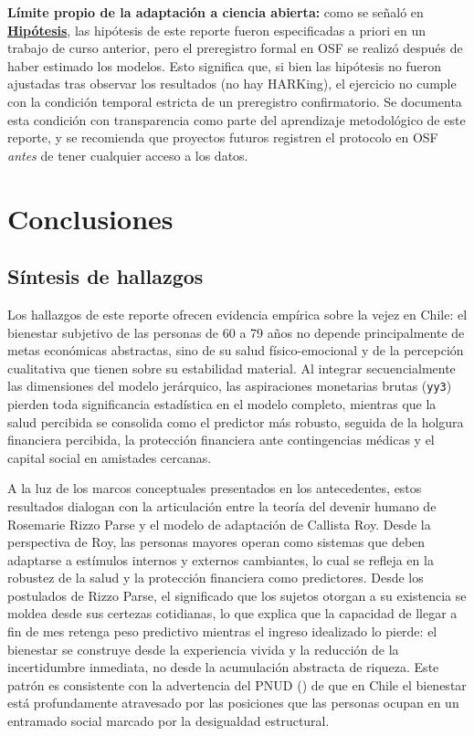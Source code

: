 \documentclass[
  spanish,
  a4paper,
  oneside]{scrbook}
\begin{document}
\textbf{Límite propio de la adaptación a ciencia abierta:} como se
señaló en \hyperref[sec-hipotesis]{\textbf{Hipótesis}}, las hipótesis de
este reporte fueron especificadas a priori en un trabajo de curso
anterior, pero el preregistro formal en OSF se realizó después de haber
estimado los modelos. Esto significa que, si bien las hipótesis no
fueron ajustadas tras observar los resultados (no hay HARKing), el
ejercicio no cumple con la condición temporal estricta de un preregistro
confirmatorio. Se documenta esta condición con transparencia como parte
del aprendizaje metodológico de este reporte, y se recomienda que
proyectos futuros registren el protocolo en OSF \emph{antes} de tener
cualquier acceso a los datos.


\chapter{Conclusiones}\label{conclusiones}

\section{Síntesis de hallazgos}\label{suxedntesis-de-hallazgos}

Los hallazgos de este reporte ofrecen evidencia empírica sobre la vejez
en Chile: el bienestar subjetivo de las personas de 60 a 79 años no
depende principalmente de metas económicas abstractas, sino de su salud
físico-emocional y de la percepción cualitativa que tienen sobre su
estabilidad material. Al integrar secuencialmente las dimensiones del
modelo jerárquico, las aspiraciones monetarias brutas (\texttt{yy3})
pierden toda significancia estadística en el modelo completo, mientras
que la salud percibida se consolida como el predictor más robusto,
seguida de la holgura financiera percibida, la protección financiera
ante contingencias médicas y el capital social en amistades cercanas.

A la luz de los marcos conceptuales presentados en los antecedentes,
estos resultados dialogan con la articulación entre la teoría del
devenir humano de Rosemarie Rizzo Parse y el modelo de adaptación de
Callista Roy. Desde la perspectiva de Roy, las personas mayores operan
como sistemas que deben adaptarse a estímulos internos y externos
cambiantes, lo cual se refleja en la robustez de la salud y la
protección financiera como predictores. Desde los postulados de Rizzo
Parse, el significado que los sujetos otorgan a su existencia se moldea
desde sus certezas cotidianas, lo que explica que la capacidad de llegar
a fin de mes retenga peso predictivo mientras el ingreso idealizado lo
pierde: el bienestar se construye desde la experiencia vivida y la
reducción de la incertidumbre inmediata, no desde la acumulación
abstracta de riqueza. Este patrón es consistente con la advertencia del
PNUD () de que en Chile el bienestar está profundamente
atravesado por las posiciones que las personas ocupan en un entramado
social marcado por la desigualdad estructural.
\end{document}

